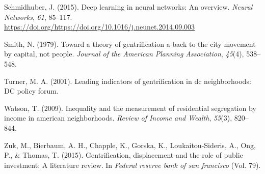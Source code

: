 \documentclass[12pt,]{article}
\begin{document}
\leavevmode\hypertarget{ref-SCHMIDHUBER201585}{}%
Schmidhuber, J. (2015). Deep learning in neural networks: An overview.
\emph{Neural Networks}, \emph{61}, 85--117.
\url{https://doi.org/https://doi.org/10.1016/j.neunet.2014.09.003}

\leavevmode\hypertarget{ref-Smith1979}{}%
Smith, N. (1979). Toward a theory of gentrification a back to the city
movement by capital, not people. \emph{Journal of the American Planning
Association}, \emph{45}(4), 538--548.

\leavevmode\hypertarget{ref-Turner2001}{}%
Turner, M. A. (2001). Leading indicators of gentrification in dc
neighborhoods: DC policy forum.

\leavevmode\hypertarget{ref-Watson2009}{}%
Watson, T. (2009). Inequality and the measurement of residential
segregation by income in american neighborhoods. \emph{Review of Income
and Wealth}, \emph{55}(3), 820--844.

\leavevmode\hypertarget{ref-Zuk2015}{}%
Zuk, M., Bierbaum, A. H., Chapple, K., Gorska, K., Loukaitou-Sideris,
A., Ong, P., \& Thomas, T. (2015). Gentrification, displacement and the
role of public investment: A literature review. In \emph{Federal reserve
bank of san francisco} (Vol. 79).
\end{document}
